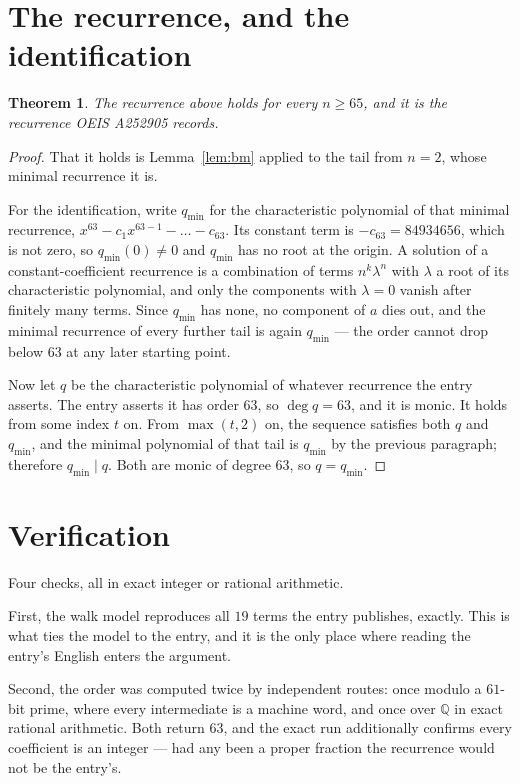 \documentclass[11pt,a4paper]{article}
\theoremstyle{plain}
\newtheorem{theorem}{Theorem}
\theoremstyle{definition}
\begin{document}
\section{The recurrence, and the identification}

\begin{theorem}
The recurrence above holds for every $n\ge65$, and it is the recurrence OEIS A252905 records.
\end{theorem}

\begin{proof}
That it holds is Lemma~\ref{lem:bm} applied to the tail from $n=2$, whose minimal
recurrence it is.

For the identification, write $q_{\min}$ for the characteristic polynomial of that minimal
recurrence, $x^{63}-c_1x^{63-1}-\dots-c_{63}$. Its constant term is
$-c_{63}=84934656$, which is not zero, so $q_{\min}(0)\neq0$ and $q_{\min}$ has no
root at the origin. A solution of a constant-coefficient recurrence is a combination of terms
$n^{k}\lambda^{n}$ with $\lambda$ a root of its characteristic polynomial, and only the
components with $\lambda=0$ vanish after finitely many terms. Since $q_{\min}$ has none, no
component of $a$ dies out, and the minimal recurrence of every further tail is again
$q_{\min}$ --- the order cannot drop below $63$ at any later starting point.

Now let $q$ be the characteristic polynomial of whatever recurrence the entry asserts. The
entry asserts it has order $63$, so $\deg q=63$, and it is monic. It holds from some
index $t$ on. From $\max(t,2)$ on, the sequence satisfies both $q$ and $q_{\min}$, and
the minimal polynomial of that tail is $q_{\min}$ by the previous paragraph; therefore
$q_{\min}\mid q$. Both are monic of degree $63$, so $q=q_{\min}$.
\end{proof}

\section{Verification}

Four checks, all in exact integer or rational arithmetic.

First, the walk model reproduces all $19$ terms the entry publishes, exactly. This is
what ties the model to the entry, and it is the only place where reading the entry's English
enters the argument.

Second, the order was computed twice by independent routes: once modulo a $61$-bit prime, where
every intermediate is a machine word, and once over $\mathbb{Q}$ in exact rational arithmetic.
Both return $63$, and the exact run additionally confirms every coefficient is an integer
--- had any been a proper fraction the recurrence would not be the entry's.
\end{document}
